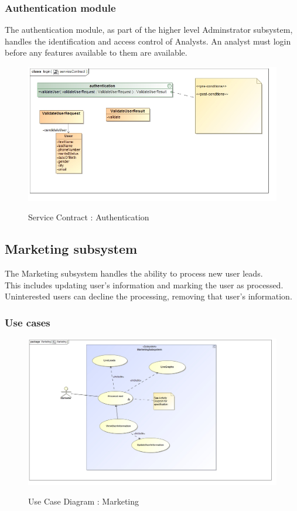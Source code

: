 \documentclass{article}
\begin{document}
	\subsubsection{Authentication module}\label{subsubsec:Auth}		
	The authentication module, as part of the higher level Adminstrator subsystem, handles the identification and access control of Analysts. An analyst must login before any features available to them are available.
		\begin{figure}[H]
		\includegraphics[width=\textwidth]{images/class__login__serviceContract.jpg}  \\
		\caption{Service Contract : Authentication}
		\label{fig:authentication}
		\end{figure}
		
		
	\pagebreak
		
\subsection{Marketing subsystem}\label{subsec:marketing}
	The Marketing subsystem handles the ability to process new user leads.\\ This includes updating user's information and marking the user as processed. Uninterested users can decline the processing, removing that user's information.
		\subsubsection{Use cases}
		\begin{figure}[H]
		\includegraphics[width=\textwidth]{images/uc__marketing_scope.jpg}  \\
		\caption{Use Case Diagram : Marketing}
		\end{figure}
\end{document}
